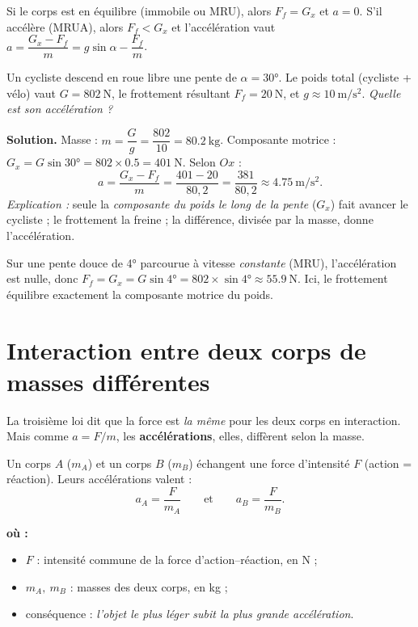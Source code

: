 \documentclass[11pt,a4paper]{article}
\newenvironment{ou}{%
  \par\smallskip\noindent\textbf{où :}\nopagebreak
  \begin{itemize}[leftmargin=1.8em,topsep=2pt,itemsep=1.5pt,parsep=0pt]}%
  {\end{itemize}}
\begin{document}
\begin{remarque}
Si le corps est en équilibre (immobile ou MRU), alors $F_f=G_x$ et $a=0$. S'il accélère (MRUA),
alors $F_f<G_x$ et l'accélération vaut $a=\dfrac{G_x-F_f}{m}=g\sin\alpha-\dfrac{F_f}{m}$.
\end{remarque}

\begin{exemple}
Un cycliste descend en roue libre une pente de $\alpha=\ang{30}$. Le poids total (cycliste + vélo)
vaut $G=\qty{802}{\newton}$, le frottement résultant $F_f=\qty{20}{\newton}$, et $g\approx\qty{10}{\metre\per\second\squared}$.
\emph{Quelle est son accélération ?}

\textbf{Solution.} Masse : $m=\dfrac{G}{g}=\dfrac{802}{10}=\qty{80,2}{\kilogram}$.
Composante motrice : $G_x=G\sin\ang{30}=802\times\num{0,5}=\qty{401}{\newton}$.
Selon $Ox$ :
\[ a=\frac{G_x-F_f}{m}=\frac{401-20}{80,2}=\frac{381}{80,2}\approx\qty{4,75}{\metre\per\second\squared}. \]
\emph{Explication :} seule la \emph{composante du poids le long de la pente} ($G_x$) fait avancer le
cycliste ; le frottement la freine ; la différence, divisée par la masse, donne l'accélération.
\end{exemple}

\begin{exemple}
Sur une pente douce de \ang{4} parcourue à vitesse \emph{constante} (MRU), l'accélération est nulle,
donc $F_f=G_x=G\sin\ang{4}=802\times\sin\ang{4}\approx\qty{55,9}{\newton}$. Ici, le frottement
équilibre exactement la composante motrice du poids.
\end{exemple}

\section{Interaction entre deux corps de masses différentes}
La troisième loi dit que la force est \emph{la même} pour les deux corps en interaction. Mais comme
$a=F/m$, les \textbf{accélérations}, elles, diffèrent selon la masse.

\begin{formule}
Un corps $A$ ($m_A$) et un corps $B$ ($m_B$) échangent une force d'intensité $F$ (action = réaction).
Leurs accélérations valent :
\[ \boxed{a_A=\frac{F}{m_A}}\qquad\text{et}\qquad \boxed{a_B=\frac{F}{m_B}}. \]
\begin{ou}
  \item $F$ : intensité commune de la force d'action–réaction, en \si{\newton} ;
  \item $m_A,\ m_B$ : masses des deux corps, en \si{\kilogram} ;
  \item conséquence : \emph{l'objet le plus léger subit la plus grande accélération}.
\end{ou}
\end{formule}
\end{document}
